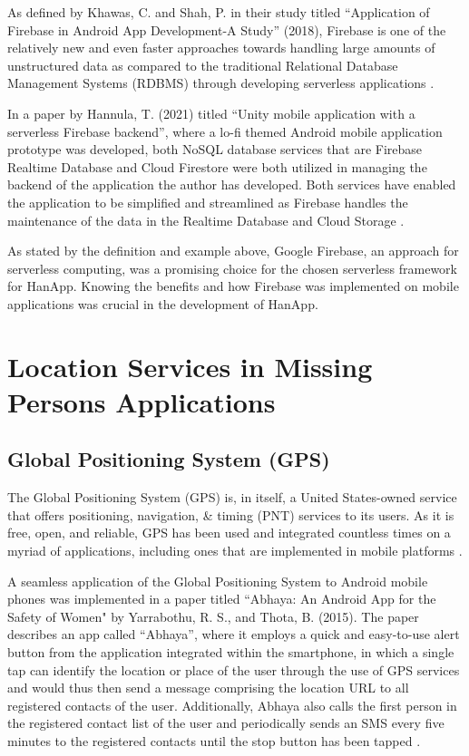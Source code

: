 As defined by Khawas, C. and Shah, P. in their study titled “Application of Firebase in Android App Development-A Study” (2018), Firebase is one of the relatively new and even faster approaches towards handling large amounts of unstructured data as compared to the traditional Relational Database Management Systems (RDBMS) through developing serverless applications 
\cite{khawas2018application}.

In a paper by Hannula, T. (2021) titled “Unity mobile application with a serverless Firebase backend”, where a lo-fi themed Android mobile application prototype was developed, both NoSQL database services that are Firebase Realtime Database and Cloud Firestore were both utilized in managing the backend of the application the author has developed. Both services have enabled the application to be simplified and streamlined as Firebase handles the maintenance of the data in the Realtime Database and Cloud Storage \cite{hannula2021unity}.

As stated by the definition and example above, Google Firebase, an approach for serverless computing, was a promising choice for the chosen serverless framework for HanApp. Knowing the benefits and how Firebase was implemented on mobile applications was crucial in the development of HanApp.


\section{Location Services in Missing Persons Applications}

\subsection{Global Positioning System (GPS)}

The Global Positioning System (GPS) is, in itself, a United States-owned service that offers positioning, navigation, \& timing (PNT) services to its users. As it is free, open, and reliable, GPS has been used and integrated countless times on a myriad of applications, including ones that are implemented in mobile platforms \cite{gpsGov}.

A seamless application of the Global Positioning System to Android mobile phones was implemented in a paper titled ``Abhaya: An Android App for the Safety of Women" by Yarrabothu, R. S., and Thota, B. (2015). The paper describes an app called “Abhaya”, where it employs a quick and easy-to-use alert button from the application integrated within the smartphone, in which a single tap can identify the location or place of the user through the use of GPS services and would thus then send a message comprising the location URL to all registered contacts of the user. Additionally, Abhaya also calls the first person in the registered contact list of the user and periodically sends an SMS every five minutes to the registered contacts until the stop button has been tapped \cite{yarrabothu2015abhaya}.

